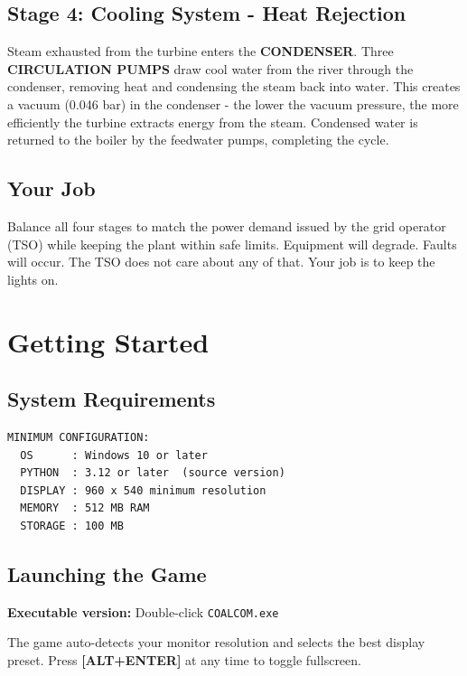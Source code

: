 \documentclass[10pt,a5paper]{article}
\newcommand{\key}[1]{\textbf{[#1]}}
\begin{document}
\subsection{Stage 4: Cooling System - Heat Rejection}

Steam exhausted from the turbine enters the \textbf{CONDENSER}. Three
\textbf{CIRCULATION PUMPS} draw cool water from the river through the condenser,
removing heat and condensing the steam back into water. This creates a vacuum
(0.046 bar) in the condenser - the lower the vacuum pressure, the more
efficiently the turbine extracts energy from the steam. Condensed water is
returned to the boiler by the feedwater pumps, completing the cycle.

\subsection{Your Job}

Balance all four stages to match the power demand issued by the grid operator
(TSO) while keeping the plant within safe limits. Equipment will degrade.
Faults will occur. The TSO does not care about any of that. Your job is to keep
the lights on.


\section{Getting Started}

\subsection{System Requirements}

\begin{Verbatim}
MINIMUM CONFIGURATION:
  OS      : Windows 10 or later
  PYTHON  : 3.12 or later  (source version)
  DISPLAY : 960 x 540 minimum resolution
  MEMORY  : 512 MB RAM
  STORAGE : 100 MB
\end{Verbatim}

\subsection{Launching the Game}

\textbf{Executable version:} Double-click \texttt{COALCOM.exe}

The game auto-detects your monitor resolution and selects the best display
preset. Press \key{ALT+ENTER} at any time to toggle fullscreen.
\end{document}
